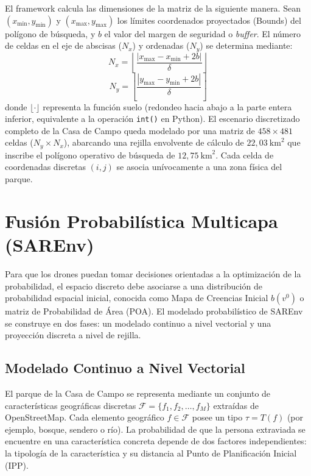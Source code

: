 El framework calcula las dimensiones de la matriz de la siguiente manera. Sean $(x_{\min}, y_{\min})$ y $(x_{\max}, y_{\max})$ los límites coordenados proyectados (Bounds) del polígono de búsqueda, y $b$ el valor del margen de seguridad o \textit{buffer}. El número de celdas en el eje de abscisas ($N_x$) y ordenadas ($N_y$) se determina mediante:
\begin{equation}
    N_x = \left\lfloor \frac{|x_{\max} - x_{\min} + 2b|}{\delta} \right\rfloor
\end{equation}
\begin{equation}
    N_y = \left\lfloor \frac{|y_{\max} - y_{\min} + 2b|}{\delta} \right\rfloor
\end{equation}
donde $\lfloor \cdot \rfloor$ representa la función suelo (redondeo hacia abajo a la parte entera inferior, equivalente a la operación \texttt{int()} en Python). El escenario discretizado completo de la Casa de Campo queda modelado por una matriz de $458 \times 481$ celdas ($N_y \times N_x$), abarcando una rejilla envolvente de cálculo de $22{,}03~\text{km}^2$ que inscribe el polígono operativo de búsqueda de $12{,}75~\text{km}^2$. Cada celda de coordenadas discretas $(i, j)$ se asocia unívocamente a una zona física del parque.

\section{Fusión Probabilística Multicapa (SAREnv)}

Para que los drones puedan tomar decisiones orientadas a la optimización de la probabilidad, el espacio discreto debe asociarse a una distribución de probabilidad espacial inicial, conocida como Mapa de Creencias Inicial $b(v^0)$ o matriz de Probabilidad de Área (POA). El modelado probabilístico de SAREnv se construye en dos fases: un modelado continuo a nivel vectorial y una proyección discreta a nivel de rejilla.

\subsection{Modelado Continuo a Nivel Vectorial}

El parque de la Casa de Campo se representa mediante un conjunto de características geográficas discretas $\mathcal{F} = \{f_1, f_2, \dots, f_M\}$ extraídas de OpenStreetMap. Cada elemento geográfico $f \in \mathcal{F}$ posee un tipo $\tau = T(f)$ (por ejemplo, bosque, sendero o río). La probabilidad de que la persona extraviada se encuentre en una característica concreta depende de dos factores independientes: la tipología de la característica y su distancia al Punto de Planificación Inicial (IPP).

